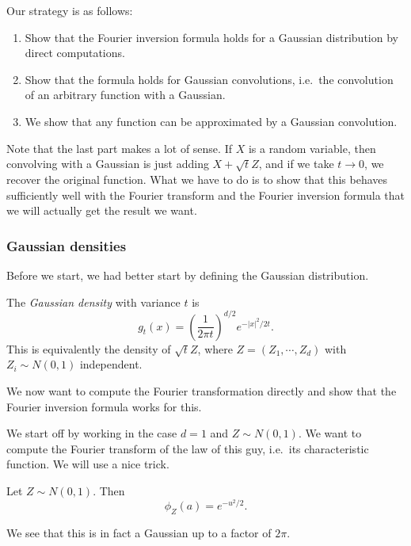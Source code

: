 \documentclass[a4paper]{article}
\begin{document}
Our strategy is as follows:
\begin{enumerate}
  \item Show that the Fourier inversion formula holds for a Gaussian distribution by direct computations.
  \item Show that the formula holds for Gaussian convolutions, i.e.\ the convolution of an arbitrary function with a Gaussian.
  \item We show that any function can be approximated by a Gaussian convolution.
\end{enumerate}
Note that the last part makes a lot of sense. If $X$ is a random variable, then convolving with a Gaussian is just adding $X + \sqrt{t}Z$, and if we take $t \to 0$, we recover the original function. What we have to do is to show that this behaves sufficiently well with the Fourier transform and the Fourier inversion formula that we will actually get the result we want.

\subsubsection*{Gaussian densities}
Before we start, we had better start by defining the Gaussian distribution.
\begin{defi}
  The \emph{Gaussian density} with variance $t$ is
  \[
    g_t(x) = \left(\frac{1}{2\pi t}\right)^{d/2} e^{-|x|^2/2t}.
  \]
  This is equivalently the density of $\sqrt{t} Z$, where $Z = (Z_1, \cdots, Z_d)$ with $Z_i \sim N(0, 1)$ independent.
\end{defi}

We now want to compute the Fourier transformation directly and show that the Fourier inversion formula works for this.

We start off by working in the case $d = 1$ and $Z \sim N(0, 1)$. We want to compute the Fourier transform of the law of this guy, i.e.\ its characteristic function. We will use a nice trick.

\begin{prop}
  Let $Z \sim N(0, 1)$. Then
  \[
    \phi_Z(a) = e^{-u^2/2}.
  \]
\end{prop}
We see that this is in fact a Gaussian up to a factor of $2\pi$.
\end{document}
